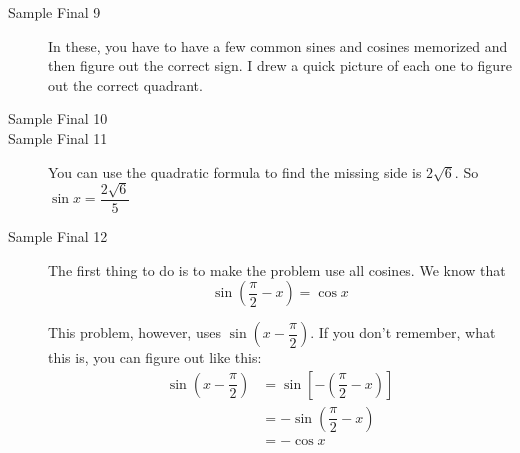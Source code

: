 \documentclass[fleqn,addpoints]{exam}
\newcommand{\degree}{\ensuremath{^\circ}}
\begin{document}
\begin{description}

\item[Sample Final 9]

In these, you have to have a few common sines and cosines memorized and then figure out the correct sign.  I drew a
quick picture of each one to figure out the correct quadrant.


\item[Sample Final 10]


\item[Sample Final 11]
You can use the quadratic formula to find the missing side is $2 \sqrt{6}$.  So $\sin x = \dfrac{2\sqrt{6}}{5}$

\item[Sample Final 12]

The first thing to do is to make the problem use all cosines.  We know that 
\[
\sin\left( \dfrac{\pi}{2} - x \right) = \cos x
\]

This problem, however, uses $\sin\left(x - \dfrac{\pi}{2} \right)$.  If you don't remember, what this is, you
can figure out like this:
\begin{align*}
  \sin\left(x - \dfrac{\pi}{2} \right) &= \sin\left[ -\left(\dfrac{\pi}{2} - x \right) \right] \\
  &= - \sin\left(\dfrac{\pi}{2} - x \right) \\
  &= - \cos x
\end{align*}


\end{description}
\end{document}
